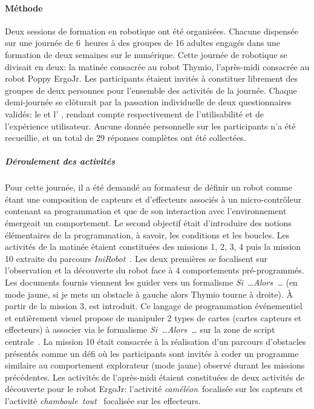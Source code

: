         \paragraph{Méthode}
            Deux sessions de formation en robotique ont été organisées. Chacune dispensée sur une journée de 6~heures à des groupes de 16 adultes engagés dans une formation de deux semaines sur le numérique. Cette journée de robotique se divisait en deux: la matinée consacrée au robot Thymio, l'après-midi consacrée au robot Poppy ErgoJr. Les participants étaient invités à constituer librement des groupes de deux personnes pour l'ensemble des activités de la journée.
            Chaque demi-journée se clôturait par la passation individuelle de deux questionnaires validés: le  et l' , rendant compte respectivement de l'utilisabilité et de l'expérience utilisateur.
            Aucune donnée personnelle sur les participants n'a été recueillie, et un total de 29 réponses complètes ont été collectées.
            \subparagraph{Déroulement des activités}
                Pour cette journée, il a été demandé au formateur de définir un robot comme étant une composition de capteurs et d'effecteurs associés à un micro-contrôleur contenant sa programmation et que de son interaction avec l'environnement émergeait un comportement. Le second objectif était d'introduire des notions élémentaires de la programmation, à savoir, les conditions et les boucles.
                Les activités de la matinée étaient constituées des missions 1, 2, 3, 4 puis la mission 10 extraite du parcours \textit{IniRobot}~. Les deux premières se focalisent sur l'observation et la découverte du robot face à 4 comportements pré-programmés. Les documents fournis viennent les guider vers un formalisme \textit{Si~\dots Alors~\dots} (\eg en mode jaune, si je mets un obstacle à gauche alors Thymio tourne à droite). À partir de la mission 3, est introduit. Ce langage de programmation événementiel et entièrement visuel propose de manipuler 2 types de cartes (\eg cartes capteurs et effecteurs) à associer via le formalisme \textit{Si~\dots Alors~\dots} sur la zone de script centrale~. La mission 10 était consacrée à la réalisation d'un parcours d'obstacles présentés comme un défi où les participants sont invités à coder un programme similaire au comportement explorateur (mode jaune) observé durant les missions précédentes.
                Les activités de l'après-midi étaient constituées de deux activités de découverte pour le robot ErgoJr: l'activité \textit{caméléon}~focalisée sur les capteurs et l'activité \textit{chamboule~tout}~ focalisée sur les effecteurs.
